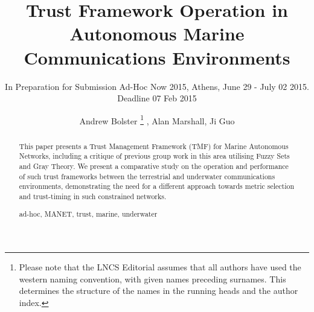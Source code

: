 \documentclass[runningheads,a4paper]{llncs}
\newcommand{\keywords}[1]{\par\addvspace\baselineskip
\noindent\keywordname\enspace\ignorespaces#1}
\begin{document}
\mainmatter  %

\title{Trust Framework Operation in Autonomous Marine Communications Environments}
\subtitle{In Preparation for Submission Ad-Hoc Now 2015, Athens, June 29 - July 02 2015. Deadline 07 Feb 2015}


%
%
\author{Andrew Bolster%
\thanks{Please note that the LNCS Editorial assumes that all authors have used
the western naming convention, with given names preceding surnames. This determines
the structure of the names in the running heads and the author index.}
, Alan Marshall, Ji Guo}
%


\maketitle


\begin{abstract}

  This paper presents a Trust Management Framework (TMF) for Marine Autonomous Networks, including a critique of previous group work in this area utilising Fuzzy Sets and Gray Theory.
  We present a comparative study on the operation and performance of such trust frameworks between the terrestrial and underwater communications environments, demonstrating the need for a different approach towards metric selection and trust-timing in such constrained networks. 
\keywords{ad-hoc, MANET, trust, marine, underwater}
\end{abstract}
\end{document}
